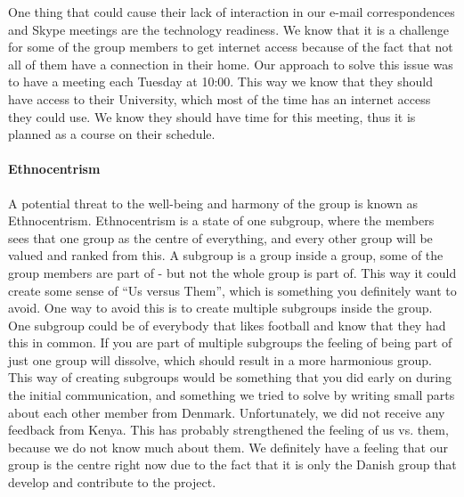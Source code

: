 One thing that could cause their lack of interaction in our e-mail correspondences and Skype meetings are the technology readiness. We know that it is a challenge for some of the group members to get internet access because of the fact that not all of them have a connection in their home. Our approach to solve this issue was to have a meeting each Tuesday at 10:00. This way we know that they should have access to their University, which most of the time has an internet access they could use. We know they should have time for this meeting, thus it is planned as a course on their schedule.

\paragraph{Ethnocentrism} \label{par:ethnocentrism}
A potential threat to the well-being and harmony of the group is known as Ethnocentrism. Ethnocentrism is a state of one subgroup, where the members sees that one group as the centre of everything, and every other group will be valued and ranked from this. A subgroup is a group inside a group, some of the group members are part of - but not the whole group is part of. This way it could create some sense of ``Us versus Them'', which is something you definitely want to avoid. One way to avoid this is to create multiple subgroups inside the group. One subgroup could be of everybody that likes football and know that they had this in common. If you are part of multiple subgroups the feeling of being part of just one group will dissolve, which should result in a more harmonious group.
This way of creating subgroups would be something that you did early on during the initial communication, and something we tried to solve by writing small parts about each other member from Denmark. Unfortunately, we did not receive any feedback from Kenya. This has probably strengthened the feeling of us vs. them, because we do not know much about them. We definitely have a feeling that our group is the centre right now due to the fact that it is only the Danish group that develop and contribute to the project.

